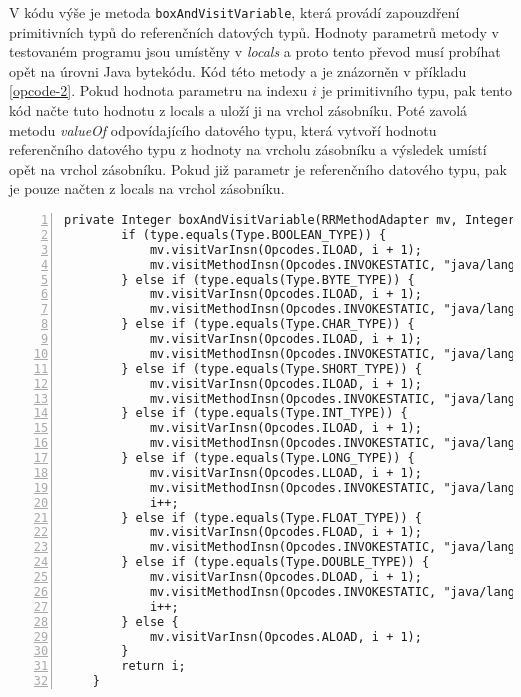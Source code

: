 V kódu výše je metoda \texttt{boxAndVisitVariable}, která provádí zapouzdření primitivních typů do referenčních datových typů. Hodnoty parametrů metody v testovaném programu jsou umístěny v \textit{locals} a proto tento převod musí probíhat opět na úrovni Java bytekódu. Kód této metody a je znázorněn v příkladu \ref{opcode-2}. Pokud hodnota parametru na indexu $i$ je primitivního typu, pak tento kód načte tuto hodnotu z locals a uloží ji na vrchol zásobníku. Poté zavolá metodu \textit{valueOf} odpovídajícího datového typu, která vytvoří hodnotu referenčního datového typu z hodnoty na vrcholu zásobníku a výsledek umístí opět na vrchol zásobníku. Pokud již parametr je referenčního datového typu, pak je pouze načten z locals na vrchol zásobníku. 

\begin{lstlisting}[frame=none, numbers=left, xleftmargin=1cm, label=opcode-1, caption=Metoda zajišťující zapouzdření primitivních datových typů.]
private Integer boxAndVisitVariable(RRMethodAdapter mv, Integer i, Type type) {
		if (type.equals(Type.BOOLEAN_TYPE)) {
			mv.visitVarInsn(Opcodes.ILOAD, i + 1);
			mv.visitMethodInsn(Opcodes.INVOKESTATIC, "java/lang/Boolean", "valueOf", "(Z)Ljava/lang/Boolean;", false);
		} else if (type.equals(Type.BYTE_TYPE)) {
			mv.visitVarInsn(Opcodes.ILOAD, i + 1);
			mv.visitMethodInsn(Opcodes.INVOKESTATIC, "java/lang/Byte", "valueOf", "(B)Ljava/lang/Byte;", false);
		} else if (type.equals(Type.CHAR_TYPE)) {
			mv.visitVarInsn(Opcodes.ILOAD, i + 1);
			mv.visitMethodInsn(Opcodes.INVOKESTATIC, "java/lang/Character", "valueOf", "(C)Ljava/lang/Character;", false);
		} else if (type.equals(Type.SHORT_TYPE)) {
			mv.visitVarInsn(Opcodes.ILOAD, i + 1);
			mv.visitMethodInsn(Opcodes.INVOKESTATIC, "java/lang/Short", "valueOf", "(S)Ljava/lang/Short;", false);
		} else if (type.equals(Type.INT_TYPE)) {
			mv.visitVarInsn(Opcodes.ILOAD, i + 1);
			mv.visitMethodInsn(Opcodes.INVOKESTATIC, "java/lang/Integer", "valueOf", "(I)Ljava/lang/Integer;", false);
		} else if (type.equals(Type.LONG_TYPE)) {
			mv.visitVarInsn(Opcodes.LLOAD, i + 1);
			mv.visitMethodInsn(Opcodes.INVOKESTATIC, "java/lang/Long", "valueOf", "(J)Ljava/lang/Long;", false);
			i++;
		} else if (type.equals(Type.FLOAT_TYPE)) {
			mv.visitVarInsn(Opcodes.FLOAD, i + 1);
			mv.visitMethodInsn(Opcodes.INVOKESTATIC, "java/lang/Float", "valueOf", "(F)Ljava/lang/Float;", false);
		} else if (type.equals(Type.DOUBLE_TYPE)) {
			mv.visitVarInsn(Opcodes.DLOAD, i + 1);
			mv.visitMethodInsn(Opcodes.INVOKESTATIC, "java/lang/Double", "valueOf", "(D)Ljava/lang/Double;", false);
			i++;
		} else {
			mv.visitVarInsn(Opcodes.ALOAD, i + 1);
		}
		return i;
	}
\end{lstlisting}

